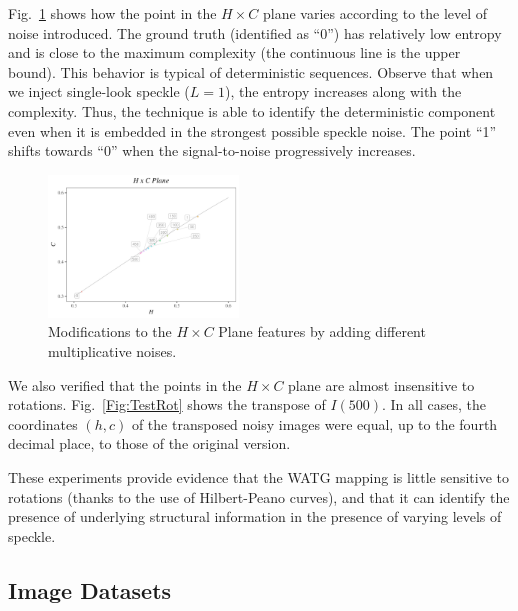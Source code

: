 \documentclass[journal]{IEEEtran}
\providecommand{\DIFaddtex}[1]{{\protect\color{blue}\uwave{#1}}} %
\providecommand{\DIFdeltex}[1]{{\protect\color{red}\sout{#1}}}                      %
\providecommand{\DIFaddbegin}{} %
\providecommand{\DIFaddend}{} %
\providecommand{\DIFdelbegin}{} %
\providecommand{\DIFdelend}{} %
\providecommand{\DIFadd}[1]{\texorpdfstring{\DIFaddtex{#1}}{#1}} %
\providecommand{\DIFdel}[1]{\texorpdfstring{\DIFdeltex{#1}}{}} %
\newcommand{\DIFscaledelfig}{0.5}
\newlength{\DIFdelgraphicswidth} %
\newlength{\DIFdelgraphicsheight} %
\newcommand{\DIFaddincludegraphics}[2][]{{\color{blue}\fbox{\DIFOincludegraphics[#1]{#2}}}} %
\newcommand{\DIFdelincludegraphics}[2][]{%
	\sbox{\DIFdelgraphicsbox}{\DIFOincludegraphics[#1]{#2}}%
	\settoboxwidth{\DIFdelgraphicswidth}{\DIFdelgraphicsbox} %
	\settoboxtotalheight{\DIFdelgraphicsheight}{\DIFdelgraphicsbox} %
	\scalebox{\DIFscaledelfig}{%
		\parbox[b]{\DIFdelgraphicswidth}{\usebox{\DIFdelgraphicsbox}\\[-\baselineskip] \rule{\DIFdelgraphicswidth}{0em}}\llap{\resizebox{\DIFdelgraphicswidth}{\DIFdelgraphicsheight}{%
				\setlength{\unitlength}{\DIFdelgraphicswidth}%
				\begin{picture}(1,1)%
				\thicklines\linethickness{2pt} %
				{\color[rgb]{1,0,0}\put(0,0){\framebox(1,1){}}}%
				{\color[rgb]{1,0,0}\put(0,0){\line( 1,1){1}}}%
				{\color[rgb]{1,0,0}\put(0,1){\line(1,-1){1}}}%
				\end{picture}%
			}\hspace*{3pt}}} %
} %
\DeclareRobustCommand{\DIFaddbegin}{\DIFOaddbegin \let\includegraphics\DIFaddincludegraphics} %
\DeclareRobustCommand{\DIFaddend}{\DIFOaddend \let\includegraphics\DIFOincludegraphics} %
\DeclareRobustCommand{\DIFdelbegin}{\DIFOdelbegin \let\includegraphics\DIFdelincludegraphics} %
\DeclareRobustCommand{\DIFdelend}{\DIFOaddend \let\includegraphics\DIFOincludegraphics} %
\begin{document}
	Fig.~\ref{Fig:TestSpeckleHC} shows how the point in the $H\times C$ plane varies according to the level of noise introduced.
	The ground truth (identified as ``\textsf{0}'') has relatively low entropy and is close to the maximum complexity (the continuous line is the upper bound).
	This behavior is typical of deterministic sequences.
	Observe that when we inject single-look speckle ($L=1$), the entropy increases along with the complexity.
	Thus, the technique is able to identify the deterministic component even when it is embedded in the strongest possible speckle noise.
	The point ``\textsf{1}'' shifts towards ``\textsf{0}'' when the signal-to-noise progressively increases.
	
	\begin{figure}
		\includegraphics[width=0.45\textwidth]{Figures/waves1.pdf}
		\caption{Modifications to the $H \times C$ Plane features by adding different multiplicative noises.}
		\label{Fig:TestSpeckleHC}
	\end{figure}
	
	We also verified that the points in the $H\times C$ plane are almost insensitive to rotations.
	Fig.~\ref{Fig:TestRot} shows the transpose of \DIFdelbegin \DIFdel{$I(500)$}\DIFdelend \DIFaddbegin \DIFadd{$I(1)$}\DIFaddend .
	In all cases, the coordinates $(h,c)$ of the transposed noisy images were equal, up to the fourth decimal place, to those of the original version.
	
	These experiments provide evidence that the WATG mapping is little sensitive to rotations (thanks to the use of Hilbert-Peano curves), and that it can identify the presence of underlying structural information in the presence of varying levels of speckle.
	
	\subsection{Image Datasets}
	
\end{document}
